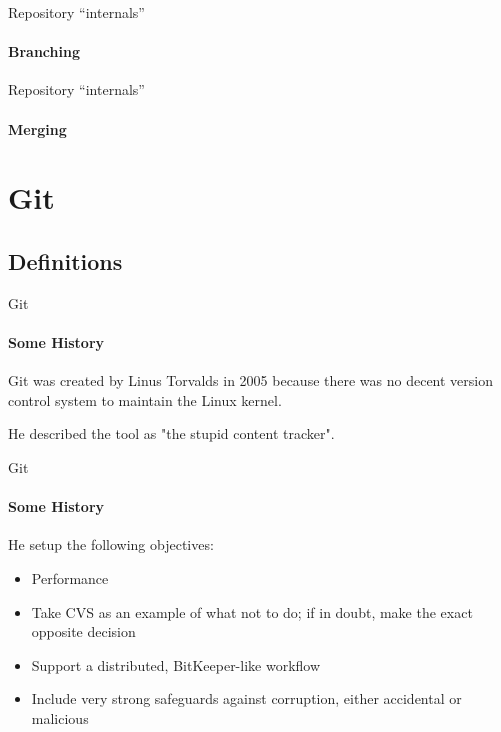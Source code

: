 \documentclass{beamer}
\begin{document}
\begin{frame}{Repository ``internals''}
\framesubtitle{Branching}%
\begin{figure}
	\centering
\end{figure}
\end{frame}

\begin{frame}{Repository ``internals''}
\framesubtitle{Merging}%
\begin{figure}
	\centering
\end{figure}
\end{frame}

\section{Git}

\subsection{Definitions}
\begin{frame}{Git}
\framesubtitle{Some History}
Git was created by Linus Torvalds in 2005 because there was no decent version control system to maintain the Linux kernel.

He described the tool as "the stupid content tracker".
\end{frame}

\begin{frame}{Git}
\framesubtitle{Some History}
He setup the following objectives:
\begin{itemize}
	\item Performance
	\item Take CVS as an example of what not to do; if in doubt, make the exact opposite decision
	\item Support a distributed, BitKeeper-like workflow
	\item Include very strong safeguards against corruption, either accidental or malicious
\end{itemize}
\end{frame}
\end{document}
